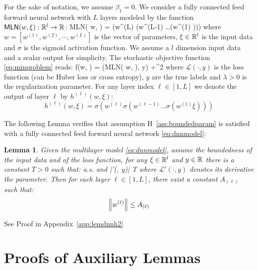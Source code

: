 \documentclass[11pt]{article}
\newtheorem{Lemma}{Lemma}
\theoremstyle{k}
\begin{document}
For the sake of notation, we assume $\beta_1 = 0$.
We consider a fully connected feed forward neural network with $L$ layers modeled by the function $\textsf{MLN}(w, \xi): \mathbb{R}^l \to \mathbb{R}$:
\beq\label{eq:dnnmodel}
\textsf{MLN}( w, \xi) = \sigma\left(w^{(L)} \sigma\left(w^{(L-1)} \ldots \sigma\left(w^{(1)} \xi \right)\right)\right)
\eeq
where $w = [w^{(1)}, w^{(2)}, \cdots , w^{(L)}]$ is the vector of parameters, $\xi \in \mathbb{R}^l$ is the input data and $\sigma$ is the sigmoid activation function. We assume a $l$ dimension input data and a scalar output for simplicity.
The stochastic objective function \eqref{eq:minproblem} reads:
\beq\label{eq:lossmln}
f(w, \xi) = (\textsf{MLN}( w, \xi), y) +^2
\eeq
where $\mathcal{L}(\cdot, y)$ is the loss function (can be Huber loss or cross entropy), $y$ are the true labels and $\lambda >0$ is the regularization parameter.
For any layer index $\ell \in [1, L]$ we denote the output of layer $\ell$ by $h^{(\ell)}(w,\xi)$:
$$
h^{(\ell)}(w,\xi) = \sigma\left(w^{(\ell)} \sigma\left(w^{(\ell-1)} \ldots \sigma\left(w^{(1)} \xi \right)\right)\right)
$$

The following Lemma verifies that assumption H~\ref{ass:boundedparam} is satisfied with a fully connected feed forward neural network \eqref{eq:dnnmodel}:
\begin{Lemma}\label{lem:dnnh2} 
Given the multilayer model \eqref{eq:dnnmodel}, assume the boundedness of the input data and of the loss function, \ie for any $\xi \in \mathbb{R}^l$ and $y \in \mathbb{R}$ there is a constant $T >0$ such that:
\beq\label{eq:mildassumptions}
\norm{\xi}  \quad \textrm{a.s.} \quad \textrm{and} |'(\cdot, y)| \leq T
\eeq
where $\mathcal{L}'(\cdot, y)$ denotes its derivative \wrt the parameter. Then for each layer $\ell \in [1,L]$, there exist a constant $A_{(\ell)}$ such that:
$$
\left\Vert w^{(\ell)} \right\Vert \leq A_{(\ell)}
$$
\end{Lemma}
See Proof in Appendix~\ref{app:lemdnnh2}



\newpage



\newpage

\appendix
\section{Proofs of Auxiliary Lemmas}
\end{document}
